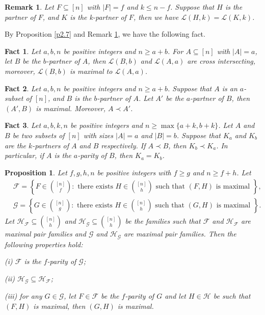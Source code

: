 \documentclass[10pt,a4paper]{amsart}
\newtheorem{proposition}{Proposition}
\newtheorem{remark}{Remark}
\newtheorem{fact}{Fact}
\begin{document}
\begin{remark}\label{r2.6}
Let $F\subseteq [n]$ with $|F|=f$ and $k\leq n-f$. Suppose that  $H$ is the partner of $F$, and $K$ is the k-partner of $F$, then we have $\mathcal{L}(H, k)=\mathcal{L}(K, k)$.
\end{remark}

By Proposition \ref{p2.7} and Remark \ref{r2.6}, we have the following fact.
\begin{fact}\label{f2.8}
Let $a, b, n$ be positive integers and $n\geq a+b$. For  $A\subseteq [n]$ with $|A|=a$, let $B$ be the $b$-partner of $A$, then
 $\mathcal{L}(B, b)$ and $\mathcal{L}(A, a)$ are cross intersecting, moreover,
  $\mathcal{L}(B, b)$ is maximal to $\mathcal{L}(A, a)$.
\end{fact}

\begin{fact}\label{f2.10}
Let $a, b, n$ be positive integers and $n\geq a+b$. Suppose that $A$ is an $a$-subset of $[n]$, and $B$ is the $b$-partner of $A$. Let $A'$ be the  $a$-partner of $B$, then $(A', B)$ is maximal. Moreover, $A\prec A'$.
\end{fact}

\begin{fact}\label{fact2.7}
Let $a, b, k, n$ be positive integers and $n\geq \max\{a+k, b+k\}$. Let $A$  and $B$ be two subsets of $[n]$ with sizes $|A|=a$ and $|B|=b$. Suppose that $K_a$ and $K_b$ are the $k$-partners of $A$ and $B$ respectively. If $A\prec B$, then $K_b\prec K_a$. In particular, if $A$ is the $a$-parity of $B$, then $K_a= K_b$.
\end{fact}

\begin{proposition}\label{prop2.9}
Let $f, g, h, n$ be positive integers with $f\geq g$ and $n\geq f+h$. Let
\begin{align*}
&\mathcal{F}=\left\{ F\in{[n]\choose f}: \text{ there exists } H\in {[n]\choose h} \text{ such that } (F, H) \text{ is maximal }  \right\},\\
&\mathcal{G}=\left\{ G\in{[n]\choose g}: \text{ there exists } H\in {[n]\choose h} \text{ such that } (G, H) \text{ is maximal }  \right\}.
\end{align*}
Let $\mathcal{H}_{\mathcal{F}}\subseteq {[n]\choose h}$ and $\mathcal{H}_{\mathcal{G}}\subseteq {[n]\choose h}$ be the families
such that $\mathcal{F}$ and $\mathcal{H}_{\mathcal{F}}$ are maximal pair families and $\mathcal{G}$ and $\mathcal{H}_{\mathcal{G}}$ are  maximal pair families.
Then the following properties hold:

(i) $\mathcal{F}$ is the $f$-parity of $\mathcal{G}$;

(ii) $\mathcal{H}_{\mathcal{G}}\subseteq \mathcal{H}_{\mathcal{F}}$;

(iii) for any $G\in \mathcal{G}$, let $F\in \mathcal{F}$ be the $f$-parity of $G$ and let $H\in \mathcal{H}$ be such that $(F, H)$ is maximal, then $(G, H)$ is maximal.
\end{proposition}
\end{document}
